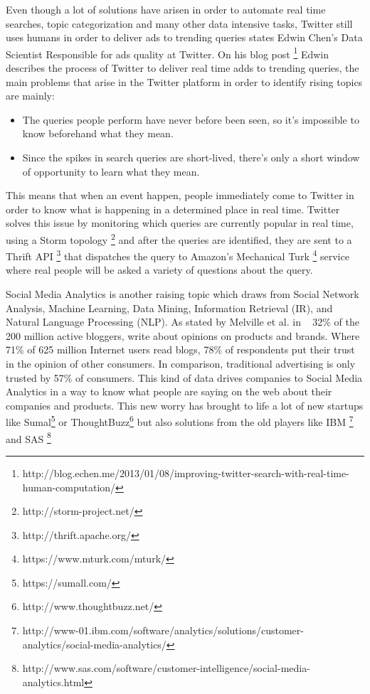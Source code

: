 Even though a lot of solutions have arisen in order to automate real time searches, topic categorization and many other data intensive tasks, Twitter still uses humans in order to deliver ads to trending queries states Edwin Chen's Data Scientist Responsible for ads quality at Twitter. On his blog post \footnote{http://blog.echen.me/2013/01/08/improving-twitter-search-with-real-time-human-computation/} Edwin describes the process of Twitter to deliver real time adds to trending queries, the main problems that arise in the Twitter platform in order to identify rising topics are mainly:
\begin{itemize}
  \item The queries people perform have never before been seen, so it's impossible to know beforehand what they mean.
  \item Since the spikes in search queries are short-lived, there's only a short window of opportunity to learn what they mean.
\end{itemize}
This means that when an event happen, people immediately come to Twitter in order to know what is happening in a determined place in real time. Twitter solves this issue by monitoring which queries are currently popular in real time, using a Storm topology \footnote{http://storm-project.net/} and after the queries are identified, they are sent to a Thrift API \footnote{http://thrift.apache.org/} that dispatches the query to Amazon's Mechanical Turk \footnote{https://www.mturk.com/mturk/} service where real people will be asked a variety of questions about the query.

Social Media Analytics is another raising topic which draws from Social Network Analysis, Machine Learning, Data Mining, Information Retrieval (IR), and Natural Language Processing (NLP). As stated by Melville et al. in ~\cite{Melville2009} 32\% of the 200 million active bloggers, write about opinions on products and brands. Where 71\% of 625 million Internet users read blogs, 78\% of respondents put their trust in the opinion of other consumers. In comparison, traditional advertising is only trusted by 57\% of consumers.
This kind of data drives companies to Social Media Analytics in a way to know what people are saying on the web about their companies and products. This new worry has brought to life a lot of new startups like Sumal\footnote{https://sumall.com/} or ThoughtBuzz\footnote{http://www.thoughtbuzz.net/} but also solutions from the old players like IBM \footnote{http://www-01.ibm.com/software/analytics/solutions/customer-analytics/social-media-analytics/} and SAS \footnote{http://www.sas.com/software/customer-intelligence/social-media-analytics.html}

